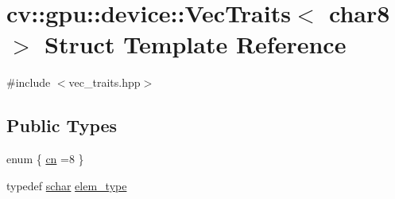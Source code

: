 \hypertarget{structcv_1_1gpu_1_1device_1_1VecTraits_3_01char8_01_4}{\section{cv\-:\-:gpu\-:\-:device\-:\-:Vec\-Traits$<$ char8 $>$ Struct Template Reference}
\label{structcv_1_1gpu_1_1device_1_1VecTraits_3_01char8_01_4}
}


{\ttfamily \#include $<$vec\-\_\-traits.\-hpp$>$}

\subsection*{Public Types}
\begin{DoxyCompactItemize}
\item 
enum \{ \hyperlink{structcv_1_1gpu_1_1device_1_1VecTraits_3_01char8_01_4_a87557e76608e3461d10557c6f802d305a7ce35c01472291fd473ca07ffe5f4c1e}{cn} =8
 \}
\item 
typedef \hyperlink{core_2types__c_8h_a0fd9ce9d735064461bebfe6037026093}{schar} \hyperlink{structcv_1_1gpu_1_1device_1_1VecTraits_3_01char8_01_4_a42958b3e5f97f3490675caabaa7faf3c}{elem\-\_\-type}
\end{DoxyCompactItemize}
